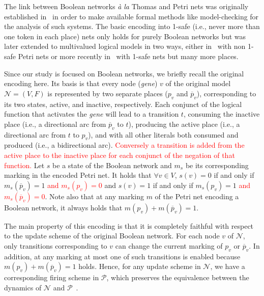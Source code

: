 \documentclass[preprint,12pt]{elsarticle}
\newcommand{\change}[1]{\textcolor{red}{#1}}
\begin{document}
The link between Boolean networks \emph{à la} Thomas and Petri nets was originally established in~\cite{chaouiya2004qualitative} in order to make available formal methods like model-checking for the analysis of such systems.
The basic encoding into 1-safe (i.e., never more than one token in each place) nets only holds for purely Boolean networks but was later extended to multivalued logical models in two ways, either in~\cite{chaouiya2011petri} with non 1-safe Petri nets or more recently in~\cite{chatain2014characterization} with 1-safe nets but many more places.

Since our study is focused on Boolean networks, we briefly recall the original encoding here.
Its basis is that every node (\emph{gene}) \(v\) of the original model \(\mathcal{N} = (V, F)\) is represented by two separate places (\(p_v\) and \(\overline{p}_v\)), corresponding to its two states, active, and inactive, respectively.
Each conjunct of the logical function that activates the \emph{gene} will lead to a transition \(t\), consuming the inactive place (i.e., a directional arc from \(\overline{p}_v\) to \(t\)), producing the active place (i.e., a directional arc from \(t\) to \(p_v\)), and with all other literals both consumed and produced (i.e., a bidirectional arc).
\change{Conversely a transition is added from the active place to the inactive place for each conjunct of the negation of that function.}
Let \(s\) be a state of the Boolean network and \(m_s\) be its corresponding marking in the encoded Petri net.
It holds that \(\forall v \in V\), \(s(v) = 0\) if and only if \(m_s(\overline{p}_v) = 1\) \change{and \(m_s(p_v) = 0\)} and \(s(v) = 1\) if and only if \(m_s(p_v) = 1\) \change{and \(m_s(\overline{p}_v) = 0\)}. Note also that at any marking \(m\) of the Petri net encoding a Boolean network, it always holds that \(m(p_v) + m(\overline{p}_v) = 1\).

The main property of this encoding is that it is completely faithful with respect to the update scheme of the original Boolean network.
For each node \(v\) of \(\mathcal{N}\), only transitions corresponding to \(v\) can change the current marking of \(p_v\) or \(\overline{p}_v\).
In addition, at any marking at most one of such transitions is enabled because \(m(p_v) + m(\overline{p}_v) = 1\) holds.
Hence, for any update scheme in \(\mathcal{N}\), we have a corresponding firing scheme in \(\mathcal{P}\), which preserves the equivalence between the dynamics of \(\mathcal{N}\) and \(\mathcal{P}\)~\cite{DBLP:journals/nc/ChatainHKPT20}.
\end{document}
